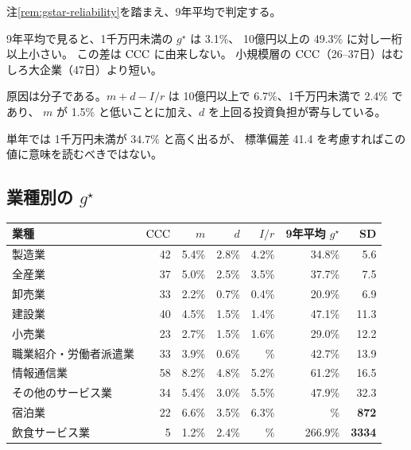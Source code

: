 注\ref{rem:gstar-reliability}を踏まえ、9年平均で判定する。

\begin{proposition}
\label{prop:small-margin}
9年平均で見ると、1千万円未満の $g^\star$ は 3.1\%、
10億円以上の 49.3\% に対し一桁以上小さい。
この差は $\mathrm{CCC}$ に由来しない。
小規模層の $\mathrm{CCC}$（26--37日）はむしろ大企業（47日）より短い。

原因は分子である。$m+d-I/r$ は
10億円以上で 6.7\%、1千万円未満で 2.4\% であり、
$m$ が 1.5\% と低いことに加え、$d$ を上回る投資負担が寄与している。
\end{proposition}

単年では 1千万円未満が $34.7\%$ と高く出るが、
標準偏差 41.4 を考慮すればこの値に意味を読むべきではない。

\subsection{業種別の \texorpdfstring{$g^\star$}{g*}}

\begin{center}
\begin{tabular}{@{}lrrrrrr@{}}
\toprule
業種 & $\mathrm{CCC}$ & $m$ & $d$ & $I/r$ & 9年平均 $g^\star$ & SD \\
\midrule
製造業 & 42 & 5.4\% & 2.8\% & 4.2\% & 34.8\% & 5.6 \\
全産業 & 37 & 5.0\% & 2.5\% & 3.5\% & 37.7\% & 7.5 \\
卸売業 & 33 & 2.2\% & 0.7\% & 0.4\% & 20.9\% & 6.9 \\
建設業 & 40 & 4.5\% & 1.5\% & 1.4\% & 47.1\% & 11.3 \\
小売業 & 23 & 2.7\% & 1.5\% & 1.6\% & 29.0\% & 12.2 \\
職業紹介・労働者派遣業 & 33 & 3.9\% & 0.6\% & \textminus 0.3\% & 42.7\% & 13.9 \\
情報通信業 & 58 & 8.2\% & 4.8\% & 5.2\% & 61.2\% & 16.5 \\
その他のサービス業 & 34 & 5.4\% & 3.0\% & 5.5\% & 47.9\% & 32.3 \\
\midrule
宿泊業 & 22 & 6.6\% & 3.5\% & 6.3\% & \textminus 204.2\% & \textbf{872} \\
飲食サービス業 & 5 & 1.2\% & 2.4\% & \textminus 0.4\% & 266.9\% & \textbf{3334} \\
\bottomrule
\end{tabular}
\label{tab:gstar-by-industry}
\end{center}

